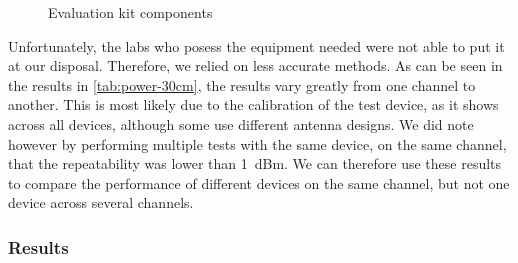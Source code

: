 \begin{figure}[bth]
  \caption{Evaluation kit components}
  \label{fig:eval-kit}
\end{figure}

Unfortunately, the labs who posess the equipment needed were not able to put it
at our disposal. Therefore, we relied on less accurate methods. As can be seen
in the results in \autoref{tab:power-30cm}, the results vary greatly from one
channel to another. This is most likely due to the calibration of the test
device, as it shows across all devices, although some use different antenna
designs. We did note however by performing multiple tests with the same device,
on the same channel, that the repeatability was lower than \SI{1}{dBm}. We can
therefore use these results to compare the performance of different devices on
the same channel, but not one device across several channels.

\subsubsection{Results}\label{power-results}

